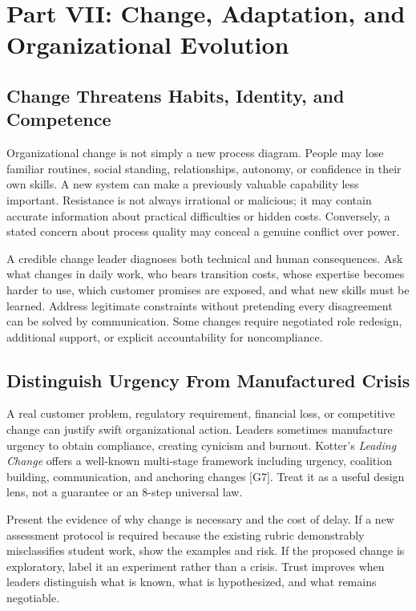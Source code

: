 \section*{Part VII: Change, Adaptation, and Organizational Evolution}

\subsection{Change Threatens Habits, Identity, and Competence}
\label{sec:change_threatens_habits}

Organizational change is not simply a new process diagram. People may lose familiar routines, social standing, relationships, autonomy, or confidence in their own skills. A new system can make a previously valuable capability less important. Resistance is not always irrational or malicious; it may contain accurate information about practical difficulties or hidden costs. Conversely, a stated concern about process quality may conceal a genuine conflict over power.

A credible change leader diagnoses both technical and human consequences. Ask what changes in daily work, who bears transition costs, whose expertise becomes harder to use, which customer promises are exposed, and what new skills must be learned. Address legitimate constraints without pretending every disagreement can be solved by communication. Some changes require negotiated role redesign, additional support, or explicit accountability for noncompliance.

\subsection{Distinguish Urgency From Manufactured Crisis}
\label{sec:urgency_vs_manufactured_crisis}

A real customer problem, regulatory requirement, financial loss, or competitive change can justify swift organizational action. Leaders sometimes manufacture urgency to obtain compliance, creating cynicism and burnout. Kotter's \textit{Leading Change} offers a well-known multi-stage framework including urgency, coalition building, communication, and anchoring changes [G7]. Treat it as a useful design lens, not a guarantee or an 8-step universal law.

Present the evidence of why change is necessary and the cost of delay. If a new assessment protocol is required because the existing rubric demonstrably misclassifies student work, show the examples and risk. If the proposed change is exploratory, label it an experiment rather than a crisis. Trust improves when leaders distinguish what is known, what is hypothesized, and what remains negotiable.


